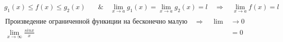 \documentclass[10pt,a4paper]{scrartcl}
\begin{document}
	\begin{align*}
	g_1(x) \leqslant f(x) \leqslant g_2(x) \quad &\& \quad \lim\limits_{x\to a} g_1(x) = \lim\limits_{x\to a} g_2(x) = l  \quad \Rightarrow \quad \lim\limits_{x\to a} f(x) =l \\
	\end{align*}
	\begin{align*}
	\text{Произведение ограниченной функиции на бесконечно малую} \quad \Rightarrow \quad \lim  & \rightarrow 0 \\
	\lim\limits_{x\to \infty} \frac{sinx}{x} & = 0
	\end{align*}
\end{document}
